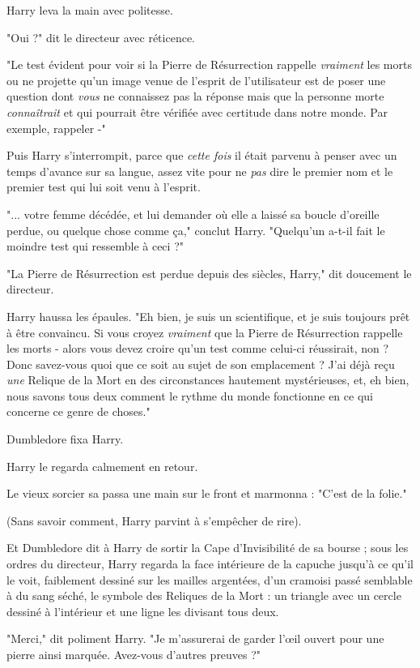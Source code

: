 Harry leva la main avec politesse.

"Oui ?" dit le directeur avec réticence.

"Le test évident pour voir si la Pierre de Résurrection rappelle \emph{vraiment}  les morts ou ne projette qu'un image venue de l'esprit de l'utilisateur est de poser une question dont \emph{vous}  ne connaissez pas la réponse mais que la personne morte \emph{connaîtrait}  et qui pourrait être vérifiée avec certitude dans notre monde. Par exemple, rappeler -"

Puis Harry s'interrompit, parce que \emph{cette fois}  il était parvenu à penser avec un temps d'avance sur sa langue, assez vite pour ne \emph{pas}  dire le premier nom et le premier test qui lui soit venu à l'esprit.

"... votre femme décédée, et lui demander où elle a laissé sa boucle d'oreille perdue, ou quelque chose comme ça," conclut Harry. "Quelqu'un a-t-il fait le moindre test qui ressemble à ceci ?"

"La Pierre de Résurrection est perdue depuis des siècles, Harry," dit doucement le directeur.

Harry haussa les épaules. "Eh bien, je suis un scientifique, et je suis toujours prêt à être convaincu. Si vous croyez \emph{vraiment}  que la Pierre de Résurrection rappelle les morts - alors vous devez croire qu'un test comme celui-ci réussirait, non ? Donc savez-vous quoi que ce soit au sujet de son emplacement ? J'ai déjà reçu \emph{une}  Relique de la Mort en des circonstances hautement mystérieuses, et, eh bien, nous savons tous deux comment le rythme du monde fonctionne en ce qui concerne ce genre de choses."

Dumbledore fixa Harry.

Harry le regarda calmement en retour.

Le vieux sorcier sa passa une main sur le front et marmonna : "C'est de la folie."

(Sans savoir comment, Harry parvint à s'empêcher de rire).

Et Dumbledore dit à Harry de sortir la Cape d'Invisibilité de sa bourse ; sous les ordres du directeur, Harry regarda la face intérieure de la capuche jusqu'à ce qu'il le voit, faiblement dessiné sur les mailles argentées, d'un cramoisi passé semblable à du sang séché, le symbole des Reliques de la Mort : un triangle avec un cercle dessiné à l'intérieur et une ligne les divisant tous deux.

"Merci," dit poliment Harry. "Je m'assurerai de garder l'œil ouvert pour une pierre ainsi marquée. Avez-vous d'autres preuves ?"

